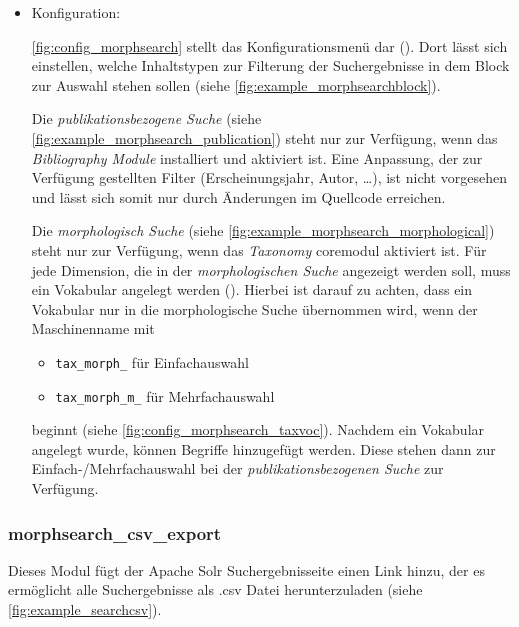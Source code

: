 \begin{itemize}[parsep=0pt, itemsep=5.0pt plus 2.0pt minus 1.0pt, leftmargin=*]
	\item Konfiguration:
	
	\cref{fig:config_morphsearch} stellt das Konfigurationsmenü dar (). Dort lässt sich einstellen, welche Inhaltstypen zur Filterung der Suchergebnisse in dem Block zur Auswahl stehen sollen (siehe \cref{fig:example_morphsearchblock}).
	
	Die \textit{publikationsbezogene Suche} (siehe \cref{fig:example_morphsearch_publication}) steht nur zur Verfügung, wenn das \textit{Bibliography Module} installiert und aktiviert ist. Eine Anpassung, der zur Verfügung gestellten Filter (Erscheinungsjahr, Autor, \dots), ist nicht vorgesehen und lässt sich somit nur durch Änderungen im Quellcode erreichen.
	
	Die \textit{morphologisch Suche} (siehe \cref{fig:example_morphsearch_morphological}) steht nur zur Verfügung, wenn das \textit{Taxonomy} \gls{coremodul} aktiviert ist. Für jede Dimension, die in der \textit{morphologischen Suche} angezeigt werden soll, muss ein Vokabular angelegt werden (). Hierbei ist darauf zu achten, dass ein Vokabular nur in die morphologische Suche übernommen wird, wenn der Maschinenname mit
	\begin{itemize}
		\item \lstinline|tax_morph_| für Einfachauswahl
		\item \lstinline|tax_morph_m_| für Mehrfachauswahl
	\end{itemize}
	beginnt (siehe \cref{fig:config_morphsearch_taxvoc}). Nachdem ein Vokabular angelegt wurde, können Begriffe hinzugefügt werden. Diese stehen dann zur Einfach-/Mehrfachauswahl bei der \textit{publikationsbezogenen Suche} zur Verfügung.
	
\end{itemize}


\subsubsection{morphsearch\_csv\_export}\label{subsub:morphsearchcsv}

Dieses Modul fügt der Apache Solr Suchergebnisseite einen Link hinzu, der es ermöglicht alle Suchergebnisse als .csv Datei herunterzuladen (siehe \cref{fig:example_searchcsv}).

